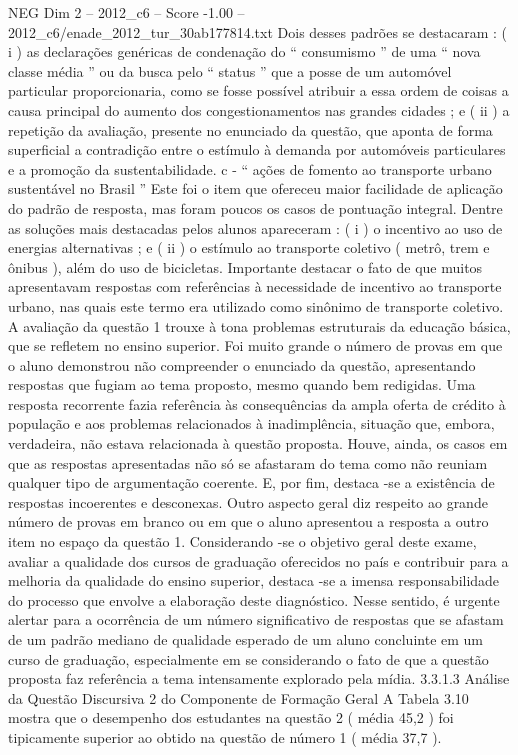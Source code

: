 \begin{textsample}{NEG Dim 2 – 2012\_c6 – Score -1.00 – 2012\_c6/enade\_2012\_tur\_30ab177814.txt}
Dois desses padrões se destacaram : ( i ) as declarações genéricas de condenação do “ consumismo ” de uma “ nova classe média ” ou da busca pelo “ status ” que a posse de um automóvel particular proporcionaria, como se fosse possível atribuir a essa ordem de coisas a causa principal do aumento dos congestionamentos nas grandes cidades ; e ( ii ) a repetição da avaliação, presente no enunciado da questão, que aponta de forma superficial a contradição entre o estímulo à demanda por automóveis particulares e a promoção da sustentabilidade. c - “ ações de fomento ao transporte urbano sustentável no Brasil ” Este foi o item que ofereceu maior facilidade de aplicação do padrão de resposta, mas foram poucos os casos de pontuação integral.
Dentre as soluções mais destacadas pelos alunos apareceram : ( i ) o incentivo ao uso de energias alternativas ; e ( ii ) o estímulo ao transporte coletivo ( metrô, trem e ônibus ), além do uso de bicicletas.
Importante destacar o fato de que muitos apresentavam respostas com referências à necessidade de incentivo ao transporte urbano, nas quais este termo era utilizado como sinônimo de transporte coletivo.
A avaliação da questão 1 trouxe à tona problemas estruturais da educação básica, que se refletem no ensino superior.
Foi muito grande o número de provas em que o aluno demonstrou não compreender o enunciado da questão, apresentando respostas que fugiam ao tema proposto, mesmo quando bem redigidas.
Uma resposta recorrente fazia referência às consequências da ampla oferta de crédito à população e aos problemas relacionados à inadimplência, situação que, embora, verdadeira, não estava relacionada à questão proposta.
Houve, ainda, os casos em que as respostas apresentadas não só se afastaram do tema como não reuniam qualquer tipo de argumentação coerente.
E, por fim, destaca -se a existência de respostas incoerentes e desconexas.
Outro aspecto geral diz respeito ao grande número de provas em branco ou em que o aluno apresentou a resposta a outro item no espaço da questão 1.
Considerando -se o objetivo geral deste exame, avaliar a qualidade dos cursos de graduação oferecidos no país e contribuir para a melhoria da qualidade do ensino superior, destaca -se a imensa responsabilidade do processo que envolve a elaboração deste diagnóstico.
Nesse sentido, é urgente alertar para a ocorrência de um número significativo de respostas que se afastam de um padrão mediano de qualidade esperado de um aluno concluinte em um curso de graduação, especialmente em se considerando o fato de que a questão proposta faz referência a tema intensamente explorado pela mídia. 3.3.1.3 Análise da Questão Discursiva 2 do Componente de Formação Geral A Tabela 3.10 mostra que o desempenho dos estudantes na questão 2 ( média 45,2 ) foi tipicamente superior ao obtido na questão de número 1 ( média 37,7 ).

\end{textsample}
